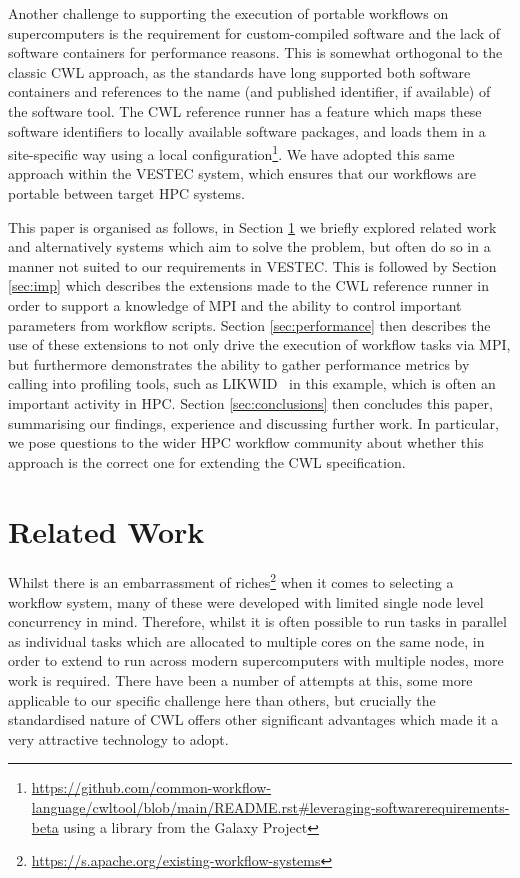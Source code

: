 \documentclass[conference]{IEEEtran}
\begin{document}
Another challenge to supporting the execution of portable workflows on supercomputers is the requirement for custom-compiled software and the lack of software containers for performance reasons.
This is somewhat orthogonal to the classic CWL approach, as the standards have long supported both software containers and references to the name (and published identifier, if available) of the software tool. The CWL reference runner has a feature which maps these software identifiers to locally available software packages, and loads them in a site-specific way using a local configuration\footnote{\url{https://github.com/common-workflow-language/cwltool/blob/main/README.rst#leveraging-softwarerequirements-beta} using a library from the Galaxy Project\cite{galaxy}}. We have adopted this same approach within the VESTEC system, which ensures that our workflows are portable between target HPC systems.


This paper is organised as follows, in Section \ref{sec:bg} we briefly explored related work and alternatively systems which aim to solve the problem, but often do so in a manner not suited to our requirements in VESTEC. This is followed by Section \ref{sec:imp} which describes the extensions made to the CWL reference runner in order to support a knowledge of MPI and the ability to control important parameters from workflow scripts. Section \ref{sec:performance} then describes the use of these extensions to not only drive the execution of workflow tasks via MPI, but furthermore demonstrates the ability to gather performance metrics by calling into profiling tools, such as LIKWID~\cite{likwid_paper} in this example, which is often an important activity in HPC. Section \ref{sec:conclusions} then concludes this paper, summarising our findings, experience and discussing further work. In particular, we pose questions to the wider HPC workflow community about whether this approach is the correct one for extending the CWL specification.

\section{Related Work}
\label{sec:bg}
Whilst there is an embarrassment of riches\footnote{\url{https://s.apache.org/existing-workflow-systems}} when it comes to selecting a workflow system, many of these were developed with limited single node level concurrency in mind. Therefore, whilst it is often possible to run tasks in parallel as individual tasks which are allocated to multiple cores on the same node, in order to extend to run across modern supercomputers with multiple nodes, more work is required. There have been a number of attempts at this, some more applicable to our specific challenge here than others, but crucially the standardised nature of CWL offers other significant advantages which made it a very attractive technology to adopt.
\end{document}
